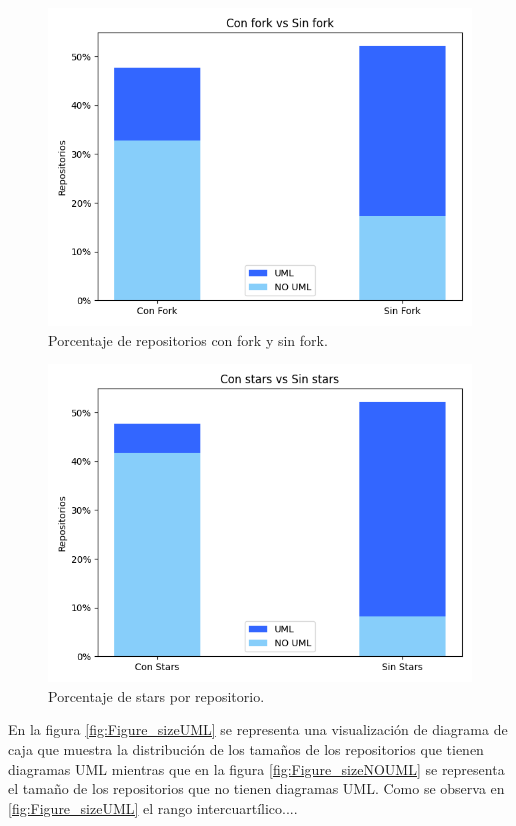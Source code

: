 \documentclass[a4paper, 12pt]{book}
\begin{document}
\begin{figure}
  \centering
  \includegraphics[width=12cm, keepaspectratio]{img/Figure_fork.png}
  \caption{Porcentaje de repositorios con fork y sin fork.}\label{fig:Figure_fork}
\end{figure}


\begin{figure}
  \centering
  \includegraphics[width=12cm, keepaspectratio]{img/Figure_stars.png}
  \caption{Porcentaje de stars por repositorio.}\label{fig:Figure_stars}
\end{figure}

En la figura \ref{fig:Figure_sizeUML} se representa una visualización de diagrama de caja que muestra la distribución de los tamaños de los repositorios que tienen diagramas UML 
mientras que en la figura \ref{fig:Figure_sizeNOUML} se representa el tamaño de los repositorios que no tienen diagramas UML.
Como se observa en \ref{fig:Figure_sizeUML} el rango intercuartílico....
\end{document}
